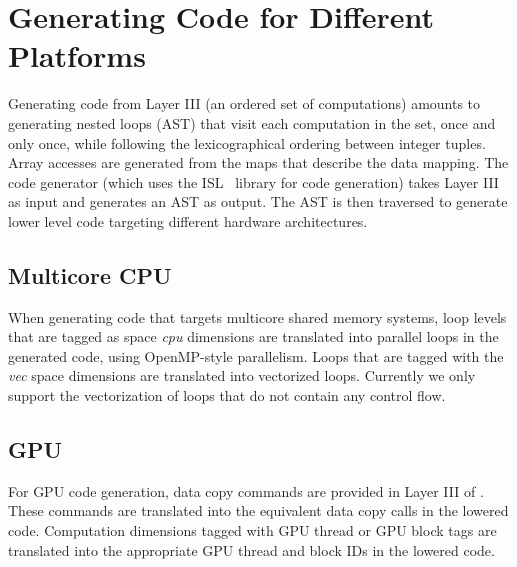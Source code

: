 
\section{Generating Code for Different Platforms}

Generating code from Layer III (an ordered set of computations) amounts to generating nested loops (AST) that visit each computation in the set, once and only once, while following the lexicographical ordering between integer tuples.
Array accesses are generated from the maps that describe the data mapping.
The \framework{} code generator (which uses the ISL~\cite{verdoolaege_isl:_2010} library for code generation) takes Layer III as input and generates an AST as output.  The AST is then traversed to generate lower level code targeting different hardware architectures. 


\vspace{-0.25cm}
\subsection{Multicore CPU}

When generating code that targets multicore shared memory systems, loop levels that are tagged as space \emph{cpu} dimensions are translated into parallel loops in the generated code, using OpenMP-style parallelism.  Loops that are tagged with the \emph{vec} space dimensions are translated into vectorized loops.  Currently we only support the vectorization of loops that do not contain any control flow.

\vspace{-0.25cm}
\subsection{GPU}
For GPU code generation, data copy commands are provided in Layer III of \framework{}.  These commands are translated into the equivalent data copy calls in the lowered code.  Computation dimensions tagged with GPU thread or GPU block tags are translated into the appropriate GPU thread and block IDs in the lowered code.


